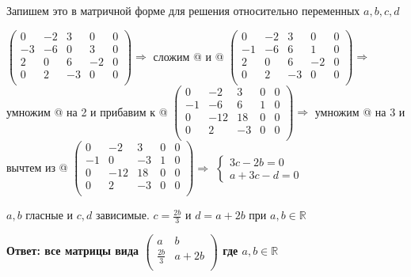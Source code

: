 \documentclass[a4paper,12pt]{article}
\makeatletter
\newcommand*{\rom}[1]{\expandafter\@slowromancap\romannumeral #1@}
\makeatother
\begin{document}
\begin{enumerate}
Запишем это в матричной форме для решения относительно переменных $a,b,c,d$

$\left(\begin{array}{cccc|c}  
 0 & -2 & 3 & 0 & 0 \\  
 -3 & -6 & 0 & 3 & 0  \\ 
 2 & 0 & 6 & -2 & 0  \\ 
 0 & 2 & -3 & 0 & 0  \\
\end{array}\right) \Rightarrow$ сложим \rom{2} и  \rom{3} $\left(\begin{array}{cccc|c}  
 0 & -2 & 3 & 0 & 0 \\  
 -1 & -6 & 6 & 1 & 0  \\ 
 2 & 0 & 6 & -2 & 0  \\ 
 0 & 2 & -3 & 0 & 0  \\
\end{array}\right) \Rightarrow$ умножим \rom{2} на 2 и прибавим к \rom{3}
$\left(\begin{array}{cccc|c}  
 0 & -2 & 3 & 0 & 0 \\  
 -1 & -6 & 6 & 1 & 0  \\ 
 0 & -12 & 18 & 0& 0  \\ 
 0 & 2 & -3 & 0 & 0  \\
\end{array}\right) \Rightarrow$ умножим \rom{1} на 3 и вычтем из \rom{2} $\left(\begin{array}{cccc|c}  
 0 & -2 & 3 & 0 & 0 \\  
 -1 & 0 & -3 & 1 & 0  \\ 
 0 & -12 & 18 & 0& 0  \\ 
 0 & 2 & -3 & 0 & 0  \\
\end{array}\right) \Rightarrow$ $\begin{cases}
3c-2b=0\\
a+3c-d=0
\end{cases}$


$a,b$ гласные и $c,d$ зависимые. $c=\frac{2b}{3}$ и $d=a+2b$ при $a,b \in \mathbb{R}$

\textbf{Ответ: все матрицы вида $\begin{pmatrix}
a & b\\
\frac{2b}{3} & a+2b\\
\end{pmatrix}$ где $a,b \in \mathbb{R}$}


\end{enumerate}
\end{document}
